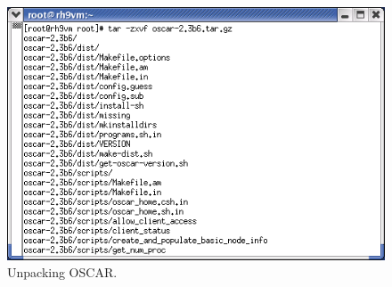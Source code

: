 
\begin{figure}[!ht]
  \begin{center}
    \centerline{\includegraphics[scale=\imgscale]{figs/0c_sbs-unpack}}
    \caption{Unpacking OSCAR.}
    \label{fig:sbs-unpacking-oscar}
  \end{center}
\end{figure}

